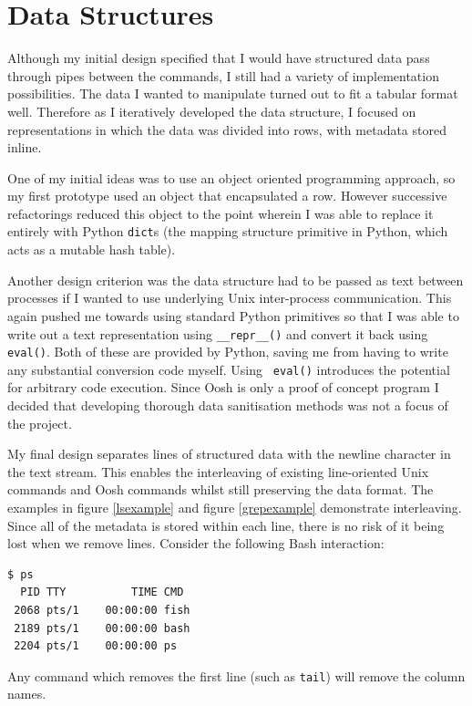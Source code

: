 \documentclass[12pt,twoside,notitlepage]{report}
\begin{document}
\section{Data Structures}
Although my initial design specified that I would have structured data
pass through pipes between the commands, I still had a variety of
implementation possibilities. The data I wanted to manipulate turned
out to fit a tabular format well. Therefore as I iteratively developed
the data structure, I focused on representations in which the data was
divided into rows, with metadata stored inline.

One of my initial ideas was to use an object oriented programming
approach, so my first prototype used an object that encapsulated a
row. However successive refactorings reduced this object to the point
wherein I was able to replace it entirely with Python {\tt dict}s (the
mapping structure primitive in Python, which acts as a mutable hash
table).

Another design criterion was the data structure had to be passed as
text between processes if I wanted to use underlying Unix
inter-process communication. This again pushed me towards using
standard Python primitives so that I was able to write out a text
representation using {\tt \_\_repr\_\_()} and convert it back using
{\tt eval()}. Both of these are provided by Python, saving me from
having to write any substantial conversion code myself. Using {\tt
  eval()} introduces the potential for arbitrary code execution. Since
Oosh is only a proof of concept program I decided that developing
thorough data sanitisation methods was not a focus of the project.

My final design separates lines of structured data with the newline
character in the text stream. This enables the interleaving of
existing line-oriented Unix commands and Oosh commands whilst still
preserving the data format. The examples in figure \ref{lsexample} and
figure \ref{grepexample} demonstrate interleaving. Since all of the
metadata is stored within each line, there is no risk of it being lost
when we remove lines. Consider the following Bash interaction:

\begin{verbatim}
$ ps
  PID TTY          TIME CMD
 2068 pts/1    00:00:00 fish
 2189 pts/1    00:00:00 bash
 2204 pts/1    00:00:00 ps
\end{verbatim}

Any command which removes the first line (such as {\tt tail}) will remove
the column names.
\end{document}
